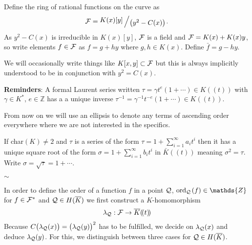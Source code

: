 \documentclass[english,11pt,a4paper]{article}
\begin{document}
\begin{defin}
  Define the ring of rational functions on the curve as
  \begin{align*}
    \F = \bigslant{K(x)[y]}{\big(y^2-C(x)\big)}.
  \end{align*}
  As $y^2-C(x)$ is irreducible in $K(x)[y]$, $\mathcal{F}$ is a field
  and $\mathcal{F} = K(x) + K(x) y$, so write elements $f \in \mathcal{F}$ as $f = g + hy$ where $g,h \in K(x)$. Define $\bar f = g - hy$.

  We will occasionally write things like $K[x,y] \subset \mathcal{F}$ but this is always implicitly understood to be in conjunction with $y^2=C(x)$.
\end{defin}

\vspace{3mm}

\textbf{Reminders}: A formal Laurent series written $\tau = \gamma t^e (1 + \cdots)\in K (\! (t)\! )$ with $\gamma \in K^*$, $e \in \mathds{Z}$ has a a unique inverse $\tau^{-1} = \gamma^{-1} t^{-e} (1 + \cdots) \in K (\! (t)\! )$.

From now on we will use an ellipsis to denote any terms of ascending order everywhere where we are not interested in the specifics.

If char$(K) \neq 2$ and $\tau$ is a series of the form $\tau = 1 + \sum_{i = 1}^{\infty} a_i t^i$ then it has a unique square root of the form $\sigma = 1+\sum_{i = 1}^{\infty} b_i t^i$ in $\bar K (\! (t)\! )$ meaning $\sigma^2 = \tau$. Write $\sigma = \sqrt \tau = 1 + \cdots$.

\vspace{-3mm}
\begin{center}
$\sim$
\end{center}

In order to define the order of a function $f$ in a point $\mathcal{Q}$, $\ordq (f) \in \mathds{Z}$ for $f \in \mathcal{F}^*$ and $\mathcal{Q} \in H(\overline K)$ we first construct a $K$-homomorphism
\begin{align*}
  \lambda_{\mathcal{Q}}: \mathcal{F} \rightarrow \overline K (\! (t)\! )
\end{align*}
Because $C\big(\lambda_{\mathcal{Q}}(x)\big)=\big(\lambda_{\mathcal{Q}}(y)\big)^2$ has to be fulfilled, we decide on $\lambda_{\mathcal{Q}}(x)$ and deduce $\lambda_{\mathcal{Q}}(y)$. For this, we distinguish between three cases for $\mathcal{Q} \in H(\overline K)$.

\newpage
\end{document}
